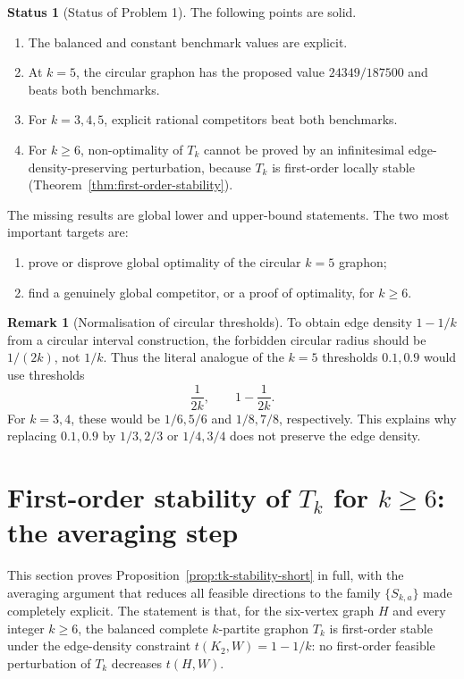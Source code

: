\documentclass[11pt]{amsart}
\theoremstyle{definition}
\newtheorem{remark}[theorem]{Remark}
\newtheorem{status}[theorem]{Status}
\newcommand{\1}{\mathbf 1}
\begin{document}
\begin{status}[Status of Problem 1]
The following points are solid.
\begin{enumerate}[label=(\roman*)]
\item The balanced and constant benchmark values are explicit.
\item At $k=5$, the circular graphon has the proposed value $24349/187500$ and
beats both benchmarks.
\item For $k=3,4,5$, explicit rational competitors beat both benchmarks.
\item For $k\ge 6$, non-optimality of $T_k$ cannot be proved by an infinitesimal
edge-density-preserving perturbation, because $T_k$ is first-order locally
stable (Theorem~\ref{thm:first-order-stability}).
\end{enumerate}
The missing results are global lower and upper-bound statements.  The two most
important targets are:
\begin{enumerate}[label=(\alph*)]
\item prove or disprove global optimality of the circular $k=5$ graphon;
\item find a genuinely global competitor, or a proof of optimality, for
$k\ge 6$.
\end{enumerate}
\end{status}

\begin{remark}[Normalisation of circular thresholds]
To obtain edge density $1-1/k$ from a circular interval construction, the
forbidden circular radius should be $1/(2k)$, not $1/k$.  Thus the literal
analogue of the $k=5$ thresholds $0.1,0.9$ would use thresholds
\[
   \frac1{2k},\qquad 1-\frac1{2k}.
\]
For $k=3,4$, these would be $1/6,5/6$ and $1/8,7/8$, respectively.  This explains
why replacing $0.1,0.9$ by $1/3,2/3$ or $1/4,3/4$ does not preserve the edge
density.
\end{remark}

\section{First-order stability of $T_k$ for $k\ge 6$: the averaging step}
\label{sec:tkstability}

This section proves Proposition~\ref{prop:tk-stability-short} in full, with the
averaging argument that reduces all feasible directions to the family
$\{S_{k,a}\}$ made completely explicit.  The statement is that, for the
six-vertex graph $H$ and every integer $k\ge 6$, the balanced complete
$k$-partite graphon $T_k$ is first-order stable under the edge-density
constraint $t(K_2,W)=1-1/k$: no first-order feasible perturbation of $T_k$
decreases $t(H,W)$.
\end{document}
